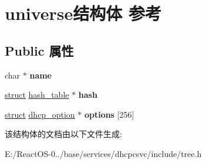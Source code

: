 \hypertarget{structuniverse}{}\section{universe结构体 参考}
\label{structuniverse}
\subsection*{Public 属性}
\begin{DoxyCompactItemize}
\item 
\mbox{\label{structuniverse_aceb6b156155704940741482e1e450250}} 
char $\ast$ {\bfseries name}
\item 
\mbox{\label{structuniverse_a3b071831a10660f7fbca5e0d92909249}} 
\hyperlink{interfacestruct}{struct} \hyperlink{structhash__table}{hash\+\_\+table} $\ast$ {\bfseries hash}
\item 
\mbox{\label{structuniverse_a2fff2b5086a68ea742804973304f11f2}} 
\hyperlink{interfacestruct}{struct} \hyperlink{structdhcp__option}{dhcp\+\_\+option} $\ast$ {\bfseries options} \mbox{[}256\mbox{]}
\end{DoxyCompactItemize}


该结构体的文档由以下文件生成\+:\begin{DoxyCompactItemize}
\item 
E\+:/\+React\+O\+S-\/0../base/services/dhcpcsvc/include/tree.\+h\end{DoxyCompactItemize}
